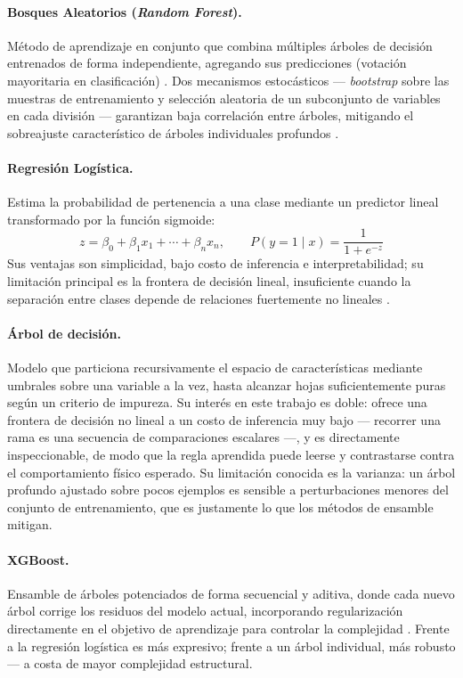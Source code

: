 \documentclass[12pt,oneside,spanish]{book}
\begin{document}
\paragraph{Bosques Aleatorios (\textit{Random Forest}).} Método de aprendizaje en conjunto que combina múltiples árboles de decisión entrenados de forma independiente, agregando sus predicciones (votación mayoritaria en clasificación) \cite{IBMRF2026}. Dos mecanismos estocásticos --- \textit{bootstrap} sobre las muestras de entrenamiento y selección aleatoria de un subconjunto de variables en cada división --- garantizan baja correlación entre árboles, mitigando el sobreajuste característico de árboles individuales profundos \cite{IBMRF2026}.

\paragraph{Regresión Logística.} Estima la probabilidad de pertenencia a una clase mediante un predictor lineal transformado por la función sigmoide:
\begin{equation}
z = \beta_{0} + \beta_{1}x_{1} + \cdots + \beta_{n}x_{n}, \qquad P(y=1\mid x) = \frac{1}{1+e^{-z}}
\end{equation}
Sus ventajas son simplicidad, bajo costo de inferencia e interpretabilidad; su limitación principal es la frontera de decisión lineal, insuficiente cuando la separación entre clases depende de relaciones fuertemente no lineales \cite{IBMLR2026}.

\paragraph{Árbol de decisión.} Modelo que particiona recursivamente el espacio de características mediante umbrales sobre una variable a la vez, hasta alcanzar hojas suficientemente puras según un criterio de impureza. Su interés en este trabajo es doble: ofrece una frontera de decisión no lineal a un costo de inferencia muy bajo --- recorrer una rama es una secuencia de comparaciones escalares ---, y es directamente inspeccionable, de modo que la regla aprendida puede leerse y contrastarse contra el comportamiento físico esperado. Su limitación conocida es la varianza: un árbol profundo ajustado sobre pocos ejemplos es sensible a perturbaciones menores del conjunto de entrenamiento, que es justamente lo que los métodos de ensamble mitigan.

\paragraph{XGBoost.} Ensamble de árboles potenciados de forma secuencial y aditiva, donde cada nuevo árbol corrige los residuos del modelo actual, incorporando regularización directamente en el objetivo de aprendizaje para controlar la complejidad \cite{IBMXGB2026}. Frente a la regresión logística es más expresivo; frente a un árbol individual, más robusto --- a costa de mayor complejidad estructural.
\end{document}
